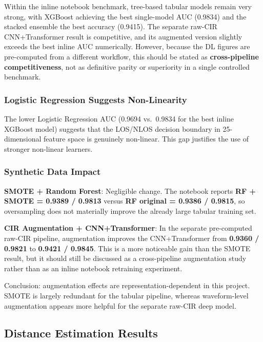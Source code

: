 \documentclass[12pt,a4paper]{article}
\begin{document}
Within the inline notebook benchmark, tree-based tabular models remain
very strong, with XGBoost achieving the best single-model AUC (0.9834)
and the stacked ensemble the best accuracy (0.9415). The separate
raw-CIR CNN+Transformer result is competitive, and its augmented version
slightly exceeds the best inline AUC numerically. However, because the
DL figures are pre-computed from a different workflow, this should be
stated as \textbf{cross-pipeline competitiveness}, not as definitive
parity or superiority in a single controlled benchmark.

\subsubsection{Logistic Regression Suggests
Non-Linearity}\label{logistic-regression-suggests-non-linearity}

The lower Logistic Regression AUC (0.9694 vs.~0.9834 for the best inline
XGBoost model) suggests that the LOS/NLOS decision boundary in
25-dimensional feature space is genuinely non-linear. This gap justifies
the use of stronger non-linear learners.

\subsubsection{Synthetic Data Impact}\label{synthetic-data-impact}

\textbf{SMOTE + Random Forest}: Negligible change. The notebook reports
\textbf{RF + SMOTE = 0.9389 / 0.9813} versus \textbf{RF original =
0.9386 / 0.9815}, so oversampling does not materially improve the
already large tabular training set.

\textbf{CIR Augmentation + CNN+Transformer}: In the separate
pre-computed raw-CIR pipeline, augmentation improves the CNN+Transformer
from \textbf{0.9360 / 0.9821} to \textbf{0.9421 / 0.9845}. This is a
more noticeable gain than the SMOTE result, but it should still be
discussed as a cross-pipeline augmentation study rather than as an
inline notebook retraining experiment.

Conclusion: augmentation effects are representation-dependent in this
project. SMOTE is largely redundant for the tabular pipeline, whereas
waveform-level augmentation appears more helpful for the separate
raw-CIR deep model.

\subsection{Distance Estimation
Results}\label{distance-estimation-results}
\end{document}
